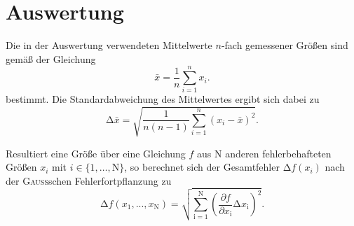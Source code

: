 \newpage
\section{Auswertung}
\label{sec:Auswertung}
Die in der Auswertung verwendeten Mittelwerte $n$-fach gemessener Größen sind gemäß der Gleichung
\begin{equation}
    \bar{x}=\frac{1}{n}\sum_{i=1}^n x_i.
    \label{eq:mittelwert}
\end{equation}
bestimmt. 
Die Standardabweichung des Mittelwertes ergibt sich dabei zu
\begin{equation}
    \mathup{\Delta}\bar{x}=\sqrt{\frac{1}{n(n-1)}\sum_{i=1}^n\left(x_i-\bar{x}\right)^2}.
    \label{eq:standardabweichung}
\end{equation}

Resultiert eine Größe über eine Gleichung $f$ aus N anderen fehlerbehafteten Größen $x_i$ mit $i\in\{1,…,\text{N}\}$, so
berechnet sich der Gesamtfehler $\mathup{\Delta}f(x_i)$ nach der \textsc{Gauß}schen Fehlerfortpflanzung zu
\begin{equation}
	\mathup{\Delta}f(x_1,...,x_\text{N})=\sqrt{\sum_{\text{i}=1}^\text{N}\left(\frac{\partial f}{\partial x_\text{i}}\mathup{\Delta}x_\text{i}\right)^2}.
	\label{eq:gauss_gen}
\end{equation}
